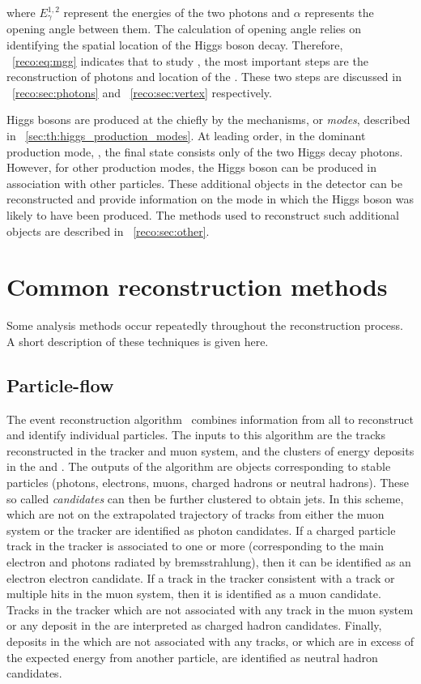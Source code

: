 where $E_{\gamma}^{1,2}$ represent the energies of the two photons and $\alpha$ represents the opening angle between them. The calculation of opening angle relies on identifying the spatial location of the Higgs boson decay. Therefore, \Eq~\ref{reco:eq:mgg} indicates that to study \Hgg, the most important steps are the reconstruction of photons and location of the \PV. These two steps are discussed in \Sec~\ref{reco:sec:photons} and \Sec~\ref{reco:sec:vertex} respectively. 

Higgs bosons are produced at the \LHC chiefly by the mechanisms, or \emph{modes}, described in \Sec~\ref{sec:th:higgs_production_modes}. At leading order, in the dominant production mode, \ggH, the final state consists only of the two Higgs decay photons. However, for other production modes, the Higgs boson can be produced in association with other particles. These additional objects in the detector can be reconstructed and provide information on the mode in which the Higgs boson was likely to have been produced. The methods used to reconstruct such additional objects are described in \Sec~\ref{reco:sec:other}.

\section{Common reconstruction methods}
\label{reco:sec:tools}

Some analysis methods occur repeatedly throughout the reconstruction process. A short description of these techniques is given here. 

\subsection{Particle-flow}
\label{reco:sec:pf}

The \PF event reconstruction algorithm~\cite{CMS-PAS-PFT-09-001,CMS-PAS-PFT-10-001} combines information from all \CMS \subdetector\s to reconstruct and identify individual particles. The inputs to this algorithm are the tracks reconstructed in the tracker and muon system, and the clusters of energy deposits in the \ECAL and \HCAL. The outputs of the algorithm are objects corresponding to stable particles (photons, electrons, muons, charged hadrons or neutral hadrons). These so called \PF \emph{candidates} can then be further clustered to obtain jets. In this scheme, \ECAL \SC\s which are not on the extrapolated trajectory of tracks from either the muon system or the tracker are identified as photon candidates. If a charged particle track in the tracker is associated to one or more \ECAL \SC\s (corresponding to the main electron and photons radiated by bremsstrahlung), then it can be identified as an electron electron candidate. If a track in the tracker consistent with a track or multiple hits in the muon system, then it is identified as a muon candidate. Tracks in the tracker which are not associated with any track in the muon system or any deposit in the \ECAL are interpreted as charged hadron candidates. Finally, deposits in the \HCAL which are not associated with any tracks, or which are in excess of the expected \HCAL energy from another \PF particle, are identified as neutral hadron candidates.

